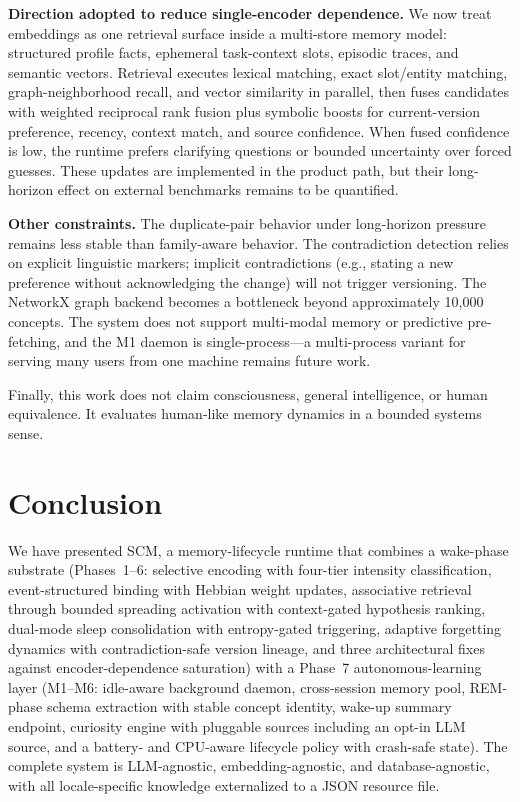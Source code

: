 \documentclass[11pt,twocolumn]{article}
\begin{document}
\textbf{Direction adopted to reduce single-encoder dependence.} We now treat embeddings as one retrieval surface inside a multi-store memory model: structured profile facts, ephemeral task-context slots, episodic traces, and semantic vectors. Retrieval executes lexical matching, exact slot/entity matching, graph-neighborhood recall, and vector similarity in parallel, then fuses candidates with weighted reciprocal rank fusion plus symbolic boosts for current-version preference, recency, context match, and source confidence. When fused confidence is low, the runtime prefers clarifying questions or bounded uncertainty over forced guesses. These updates are implemented in the product path, but their long-horizon effect on external benchmarks remains to be quantified.

\textbf{Other constraints.} The duplicate-pair behavior under long-horizon pressure remains less stable than family-aware behavior. The contradiction detection relies on explicit linguistic markers; implicit contradictions (e.g., stating a new preference without acknowledging the change) will not trigger versioning. The NetworkX graph backend becomes a bottleneck beyond approximately 10,000 concepts. The system does not support multi-modal memory or predictive pre-fetching, and the M1 daemon is single-process---a multi-process variant for serving many users from one machine remains future work.

Finally, this work does not claim consciousness, general intelligence, or human equivalence. It evaluates human-like memory dynamics in a bounded systems sense.

\section{Conclusion}

We have presented SCM, a memory-lifecycle runtime that combines a wake-phase substrate (Phases~1--6: selective encoding with four-tier intensity classification, event-structured binding with Hebbian weight updates, associative retrieval through bounded spreading activation with context-gated hypothesis ranking, dual-mode sleep consolidation with entropy-gated triggering, adaptive forgetting dynamics with contradiction-safe version lineage, and three architectural fixes against encoder-dependence saturation) with a Phase~7 autonomous-learning layer (M1--M6: idle-aware background daemon, cross-session memory pool, REM-phase schema extraction with stable concept identity, wake-up summary endpoint, curiosity engine with pluggable sources including an opt-in LLM source, and a battery- and CPU-aware lifecycle policy with crash-safe state). The complete system is LLM-agnostic, embedding-agnostic, and database-agnostic, with all locale-specific knowledge externalized to a JSON resource file.
\end{document}
